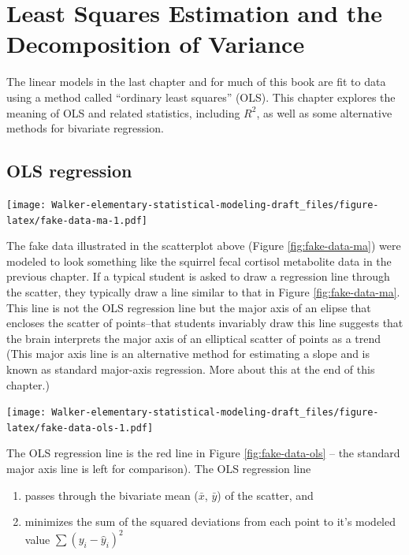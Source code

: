 \documentclass[]{book}
\providecommand{\tightlist}{%
  \setlength{\itemsep}{0pt}\setlength{\parskip}{0pt}}
\begin{document}
\chapter{Least Squares Estimation and the Decomposition of
Variance}\label{least-squares-estimation-and-the-decomposition-of-variance}

The linear models in the last chapter and for much of this book are fit
to data using a method called ``ordinary least squares'' (OLS). This
chapter explores the meaning of OLS and related statistics, including
\(R^2\), as well as some alternative methods for bivariate regression.

\section{OLS regression}\label{ols-regression}

\texttt{[image: Walker-elementary-statistical-modeling-draft\_files/figure-latex/fake-data-ma-1.pdf]}

The fake data illustrated in the scatterplot above (Figure
\ref{fig:fake-data-ma}) were modeled to look something like the squirrel
fecal cortisol metabolite data in the previous chapter. If a typical
student is asked to draw a regression line through the scatter, they
typically draw a line similar to that in Figure \ref{fig:fake-data-ma}.
This line is not the OLS regression line but the major axis of an elipse
that encloses the scatter of points--that students invariably draw this
line suggests that the brain interprets the major axis of an elliptical
scatter of points as a trend (This major axis line is an alternative
method for estimating a slope and is known as standard major-axis
regression. More about this at the end of this chapter.)

\texttt{[image: Walker-elementary-statistical-modeling-draft\_files/figure-latex/fake-data-ols-1.pdf]}

The OLS regression line is the red line in Figure
\ref{fig:fake-data-ols} -- the standard major axis line is left for
comparison). The OLS regression line

\begin{enumerate}
\def\labelenumi{\arabic{enumi}.}
\tightlist
\item
  passes through the bivariate mean (\(\bar{x}\), \(\bar{y}\)) of the
  scatter, and
\item
  minimizes the sum of the squared deviations from each point to it's
  modeled value \(\sum{(y_i - \hat{y}_i)^2}\)
\end{enumerate}
\end{document}
